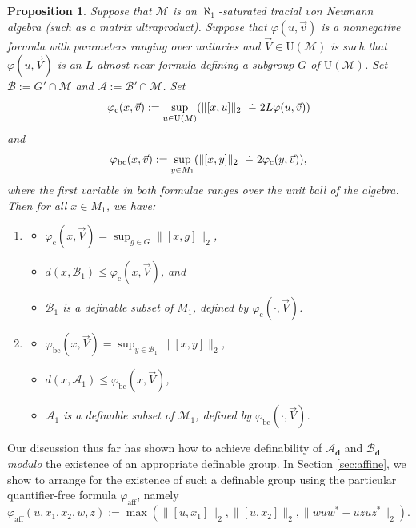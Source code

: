 \documentclass[12pt]{amsart}
\numberwithin{equation}{section}
\newtheorem{prop}[thm]{Proposition}
\theoremstyle{definition}
\newcommand{\dminus}{ 
\buildrel\textstyle\ .\over{\hbox{ 
\vrule height3pt depth0pt width0pt}{\smash-} 
}}
\def\M{\mathcal{M}}
\def \M{\mathcal{M}}
\def \A{\mathcal{A}}
\def \B{\mathcal{B}}
\begin{document}
\begin{prop}\label{prop:definability}
Suppose that $\M$ is an $\aleph_1$-saturated tracial von Neumann algebra (such as a matrix ultraproduct).  Suppose that $\varphi(u,\vec v)$ is a nonnegative formula with parameters ranging over unitaries and $\vec V\in \mathrm{U}(\M)$ is such that $\varphi(u,\vec V)$ is an $L$-almost near formula defining a subgroup $G$ of $\mathrm{U}(\M)$.  Set $\B:=G'\cap \M$ and $\A:=\B'\cap \M$.  Set $$\varphi_{\operatorname{c}}(x,\vec v):=\sup_{u\in \mathrm{U}(M)}(\|[x,u]\|_2\dminus 2L\varphi(u,\vec v))$$ and $$\varphi_{\operatorname{bc}}(x,\vec v):=\sup_{y\in M_1}(\|[x,y]\|_2\dminus 2 \varphi_{\operatorname{c}}(y,\vec v)),$$ where the first variable in both formulae ranges over the unit ball of the algebra.  Then for all $x\in M_1$, we have:
\begin{enumerate}
    \item 
    \begin{itemize}
        \item $\varphi_{\operatorname{c}}(x,\vec V)=\sup_{g\in G}\|[x,g]\|_2$,
        \item $d(x,\B_1)\leq \varphi_{\operatorname{c}}(x,\vec V)$, and
        \item $\B_1$ is a definable subset of $M_1$, defined by $\varphi_{\operatorname{c}}(\cdot,\vec V)$.
    \end{itemize}  
    \item 
    \begin{itemize}
        \item $\varphi_{\operatorname{bc}}(x,\vec V)=\sup_{y\in \B_1}\|[x,y]\|_2$,
        \item $d(x,\A_1)\leq \varphi_{\operatorname{bc}}(x,\vec V)$,
        \item $\A_1$ is a definable subset of $\M_1$, defined by $\varphi_{\operatorname{bc}}(\cdot,\vec V)$.
    \end{itemize}  
\end{enumerate}
\end{prop}

Our discussion thus far has shown how to achieve definability of $\A_{\mathbf{d}}$ and $\B_{\mathbf{d}}$ \emph{modulo} the existence of an appropriate definable group.  In Section \ref{sec:affine}, we show to arrange for the existence of such a definable group using the particular quantifier-free formula $\varphi_{\operatorname{aff}}$, namely $$\varphi_{\operatorname{aff}}(u,x_1,x_2,w,z):=\max(\|[u,x_1]\|_2,\|[u,x_2]\|_2,\|wuw^*-uzuz^*\|_2).$$
\end{document}

